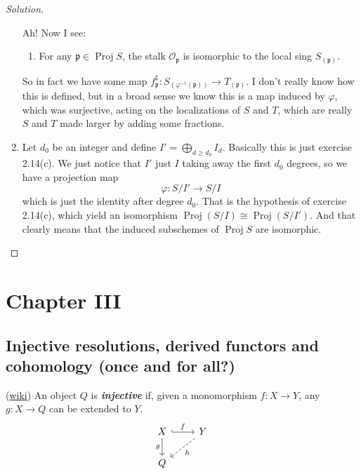 \begin{proof}[Solution]
\begin{enumerate}[label=\alph*.]
	Ah! Now I see:
	\begin{prop}[2.5]\leavevmode 
	\begin{enumerate}[label=\alph*.]
		\item For any $\mathfrak{p}\in\operatorname{Proj}S$, the stalk $\mathcal{O}_\mathfrak{p}$ is isomorphic to the local sing $S_{(\mathfrak{p})}$.
	\end{enumerate}
\end{prop}
So in fact we have some map $f^\sharp_\mathfrak{p}:S_{(\varphi^{-1}(\mathfrak{p}))}\longrightarrow T_{(\mathfrak{p})}$. I don't really know how this is defined, but in a broad sense we know this is a map induced by $\varphi$, which was surjective, acting on the localizations of $S$ and $T$, which are really $S$ and $T$ made larger by adding some fractions.

\item Let $d_0$ be an integer and define $I'=\bigoplus_{d\geq d_0}I_d$. Basically this is just exercise 2.14(c). We just notice that $I'$ just  $I$ taking away the first $d_0$ degrees, so we have a projection map
	\[\varphi:S/I'\to S/I\]
	which is just the identity after degree $d_0$. That is the hypothesis of exercise 2.14(c), which yield an isomorphism $\operatorname{Proj}(S/I)\cong \operatorname{Proj}(S/I')$. And that clearly means that the induced subschemes of $\operatorname{Proj}S$ are isomorphic.
	
	\end{enumerate}
\end{proof}


\section{Chapter III}

\subsection{Injective resolutions, derived functors and cohomology (once and for all?)}
\begin{defn}
	(\href{https://en.wikipedia.org/wiki/Injective_object#:~:text=9%20References-,Definition,can%20be%20extended%20to%20Y%20.}{wiki}) An object $Q$ is \textit{\textbf{injective}} if, given a monomorphism $f:X\to Y$, any $g:X\to Q$ can be extended to $Y$.
\[\begin{tikzcd}
X\arrow[r,"f",hook]\arrow[d,"g",swap]&Y\arrow[dl,"h",dashed]\\
Q
\end{tikzcd}\]
\end{defn}

